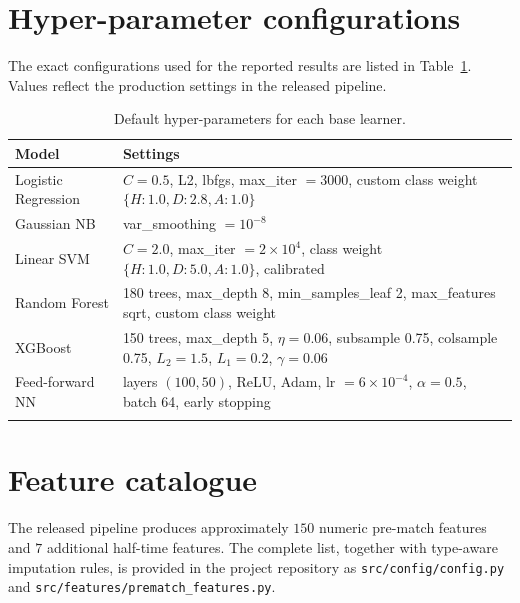 \documentclass[pdflatex,sn-mathphys-num]{sn-jnl}
\theoremstyle{thmstyleone}
\theoremstyle{thmstyletwo}
\theoremstyle{thmstylethree}
\begin{document}
\begin{appendices}

\section{Hyper-parameter configurations}\label{secA1}

The exact configurations used for the reported results are listed in
Table~\ref{tab:hparams}. Values reflect the production settings in the
released pipeline.

\begin{table}[h]
\caption{Default hyper-parameters for each base learner.}\label{tab:hparams}
\begin{tabular*}{\textwidth}{@{\extracolsep\fill}ll@{}}
\toprule
Model               & Settings \\
\midrule
Logistic Regression & $C\!=\!0.5$, L2, lbfgs, max\_iter $\!=\!3000$, custom class weight $\{H{:}1.0,D{:}2.8,A{:}1.0\}$ \\
Gaussian NB         & var\_smoothing $\!=\!10^{-8}$ \\
Linear SVM          & $C\!=\!2.0$, max\_iter $\!=\!2\!\times\!10^4$, class weight $\{H{:}1.0,D{:}5.0,A{:}1.0\}$, calibrated \\
Random Forest       & 180 trees, max\_depth 8, min\_samples\_leaf 2, max\_features sqrt, custom class weight \\
XGBoost             & 150 trees, max\_depth 5, $\eta\!=\!0.06$, subsample 0.75, colsample 0.75, $L_2\!=\!1.5$, $L_1\!=\!0.2$, $\gamma\!=\!0.06$ \\
Feed-forward NN     & layers $(100,50)$, ReLU, Adam, lr $\!=\!6\!\times\!10^{-4}$, $\alpha\!=\!0.5$, batch 64, early stopping \\
\botrule
\end{tabular*}
\end{table}

\section{Feature catalogue}\label{secA2}

The released pipeline produces approximately $150$ numeric pre-match
features and $7$ additional half-time features. The complete list,
together with type-aware imputation rules, is provided in the project
repository as \texttt{src/config/config.py} and
\texttt{src/features/prematch\_features.py}.

\end{appendices}
\end{document}
